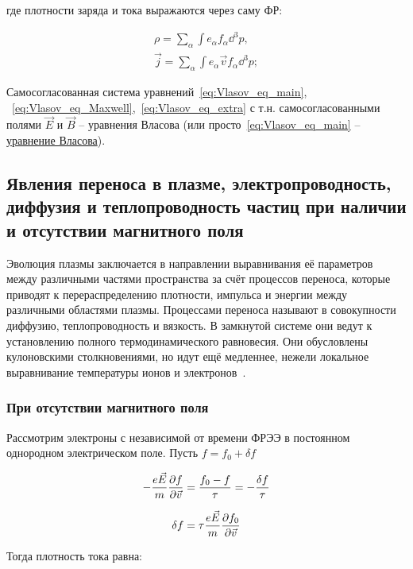 \documentclass[10pt, a4paper]{article}
\begin{document}
где плотности заряда и тока выражаются через саму ФР:

\begin{align} \label{eq:Vlasov_eq_extra}
	\rho = \sum\limits_{\alpha}\int e_\alpha f_\alpha \dd^3p, \\
	\vec{j} = \sum\limits_{\alpha}\int e_\alpha \vec{v}f_\alpha \dd^3p;
\end{align}

Самосогласованная система уравнений~\eqref{eq:Vlasov_eq_main}, ~\eqref{eq:Vlasov_eq_Maxwell},~\eqref{eq:Vlasov_eq_extra} с т.н. самосогласованными полями $\vec{E}$ и $\vec{B}$ -- уравнения Власова (или просто~\eqref{eq:Vlasov_eq_main} -- \uline{уравнение Власова}).

\subsection{Явления переноса в плазме, электропроводность, диффузия и теплопроводность частиц при наличии и отсутствии магнитного поля} \label{subsec:transport_phenomena}

Эволюция плазмы заключается в направлении выравнивания её параметров между различными частями пространства за счёт процессов переноса, которые приводят к перераспределению плотности, импульса и энергии между различными областями плазмы. Процессами переноса называют в совокупности диффузию, теплопроводность и вязкость. В замкнутой системе они ведут к установлению полного термодинамического равновесия. Они обусловлены кулоновскими столкновениями, но идут ещё медленнее, нежели локальное выравнивание температуры ионов и электронов~\cite{kotelnikov}.

\subsubsection{При отсутствии магнитного поля}

Рассмотрим электроны с независимой от времени ФРЭЭ в постоянном однородном электрическом поле. Пусть $f = f_0+\delta f$

\begin{equation*}
	-\frac{e\vec{E}}{m}\pdv{f}{\vec{v}} = \frac{f_0-f}{\tau} = -\frac{\delta f}{\tau}
\end{equation*}

\begin{equation*}
	\delta f = \tau \frac{e\vec{E}}{m} \pdv{f_0}{\vec{v}}
\end{equation*}

Тогда плотность тока равна:
\end{document}
